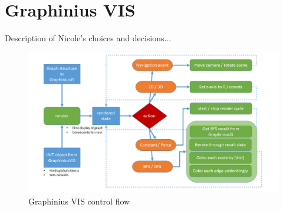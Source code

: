 	






\section{Graphinius VIS}
\label{sect:graphinius_vis}

Description of Nicole's choices and decisions...

\begin{landscape}
\begin{figure}[ht]
	\label{fig_vis_control_flow}
	\hspace*{-1cm}
	\includegraphics[width=1.9\textwidth]{figures/VIS_Control_Flow}
	\caption{Graphinius VIS control flow}
\end{figure}
\end{landscape}


